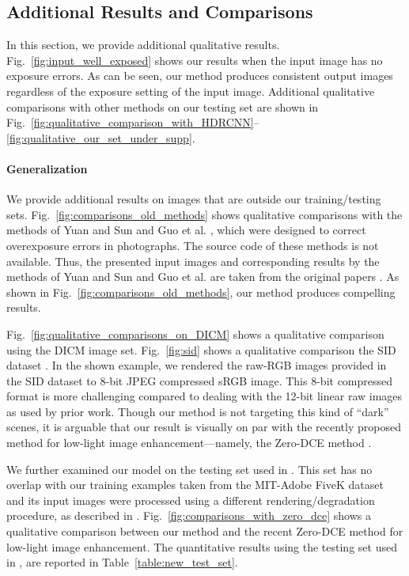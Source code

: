 \documentclass[final]{cvpr}
\begin{document}
\subsection{Additional Results and Comparisons}\label{sec:additional_results}


In this section, we provide additional qualitative results. Fig.\ \ref{fig:input_well_exposed} shows our results when the input image has no exposure errors. As can be seen, our method produces consistent output images regardless of the exposure setting of the input image. Additional qualitative comparisons with other methods on our testing set are shown in Fig.\ \ref{fig:qualitative_comparison_with_HDRCNN}--\ref{fig:qualitative_our_set_under_supp}. 


\paragraph{Generalization}
We provide additional results on images that are outside our training/testing sets. Fig.\ \ref{fig:comparisons_old_methods} shows qualitative comparisons with the methods of Yuan and Sun \cite{yuan2012automatic} and Guo et al. \cite{guo2010correcting}, which were designed to correct overexposure errors in photographs.  The source code of these methods is not available. Thus, the presented input images and corresponding results by the methods of Yuan and Sun \cite{yuan2012automatic} and Guo et al. \cite{guo2010correcting} are taken from the original papers \cite{yuan2012automatic, guo2010correcting}. As shown in Fig.\ \ref{fig:comparisons_old_methods}, our method produces compelling results. 

Fig.\ \ref{fig:qualitative_comparisons_on_DICM} shows a qualitative comparison using the DICM image set. Fig.\ \ref{fig:sid} shows a qualitative comparison the SID dataset \cite{chen2018learning}. In the shown example, we rendered the raw-RGB images provided in the SID dataset to 8-bit JPEG compressed sRGB image. This 8-bit compressed format is more challenging compared to dealing with the 12-bit linear raw images as used by prior work. Though our method is not targeting this kind of ``dark'' scenes, it is arguable that our result is visually on par with the recently proposed method for low-light image enhancement---namely, the Zero-DCE method \cite{guo2020zero}. 

We further examined our model on the testing set used in \cite{DeepUPE}. This set has no overlap with our training examples taken from the MIT-Adobe FiveK dataset \cite{fivek} and its input images were processed using a different rendering/degradation procedure, as described in \cite{DeepUPE}. Fig.\ \ref{fig:comparisons_with_zero_dce} shows a qualitative comparison between our method and the recent Zero-DCE method \cite{guo2020zero} for low-light image enhancement. The quantitative results using the testing set used in \cite{DeepUPE}, are reported in Table\ \ref{table:new_test_set}. 
\end{document}
